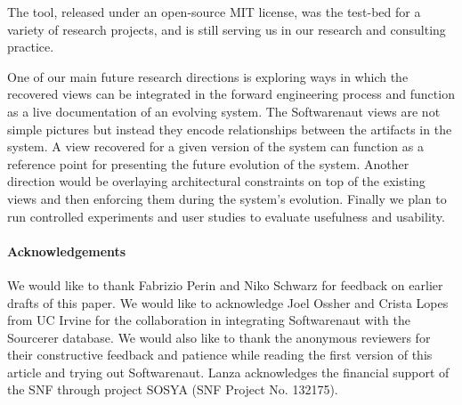 \documentclass[preprint,12pt]{elsarticle}
\begin{document}
The tool, released under an open-source MIT license, was the test-bed for a variety of research projects, and is still serving us in our research and consulting practice.

One of our main future research directions is exploring ways in which the recovered views can be integrated in the forward engineering process and function as a live documentation of an evolving system. The Softwarenaut views are not simple pictures but instead they encode relationships between the artifacts in the system. A view recovered for a given version of the system can function as a reference point for presenting the future evolution of the system. Another direction would be overlaying architectural constraints on top of the existing views and then enforcing them during the system's evolution. Finally we plan to run controlled experiments and user studies to evaluate usefulness and usability.



\paragraph{Acknowledgements} We would like to thank Fabrizio Perin and Niko Schwarz for feedback on earlier drafts of this paper. We would like to acknowledge Joel Ossher and Crista Lopes from UC Irvine for the collaboration in integrating Softwarenaut with the Sourcerer database. We would also like to thank the anonymous reviewers for their constructive feedback and patience while reading the first version of this article and trying out Softwarenaut. Lanza acknowledges the financial support of the SNF through project SOSYA (SNF Project No. 132175).
\end{document}
